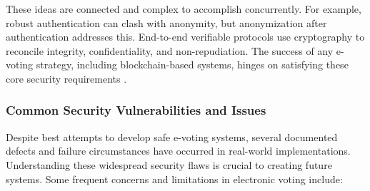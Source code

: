 \documentclass[a4paper,10pt]{report}
\begin{document}
  These ideas are connected and complex to accomplish concurrently.   For example, robust authentication can clash with anonymity, but anonymization after authentication addresses this.   End-to-end verifiable protocols use cryptography to reconcile integrity, confidentiality, and non-repudiation.   The success of any e-voting strategy, including blockchain-based systems, hinges on satisfying these core security requirements \cite{mdpi2020, arxiv2021}.
  
\subsubsection{Common Security Vulnerabilities and Issues}

Despite best attempts to develop safe e-voting systems, several documented defects and failure circumstances have occurred in real-world implementations. Understanding these widespread security flaws is crucial to creating future systems. Some frequent concerns and limitations in electronic voting include:
\end{document}
